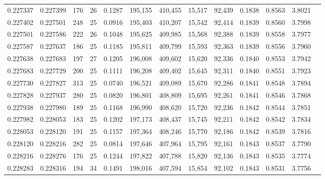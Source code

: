 \begin{tabular}{rrrrrrrrrrrrr}
0.227337 & 0.227399 &   176 &  26 &                                     0.1287 & 195,155 & 410,455 &  15,517 &  92,439 & 0.1838 & 0.8563 & 3.8021 \\
0.227402 & 0.227501 &   248 &  25 &                                     0.0916 & 195,403 & 410,207 &  15,542 &  92,414 & 0.1839 & 0.8560 & 3.7998 \\
0.227501 & 0.227586 &   222 &  26 &                                     0.1048 & 195,625 & 409,985 &  15,568 &  92,388 & 0.1839 & 0.8558 & 3.7977 \\
0.227587 & 0.227637 &   186 &  25 &                                     0.1185 & 195,811 & 409,799 &  15,593 &  92,363 & 0.1839 & 0.8556 & 3.7960 \\
0.227638 & 0.227683 &   197 &  27 &                                     0.1205 & 196,008 & 409,602 &  15,620 &  92,336 & 0.1840 & 0.8553 & 3.7942 \\
0.227683 & 0.227729 &   200 &  25 &                                     0.1111 & 196,208 & 409,402 &  15,645 &  92,311 & 0.1840 & 0.8551 & 3.7923 \\
0.227730 & 0.227827 &   313 &  25 &                                     0.0740 & 196,521 & 409,089 &  15,670 &  92,286 & 0.1841 & 0.8548 & 3.7894 \\
0.227828 & 0.227937 &   280 &  25 &                                     0.0820 & 196,801 & 408,809 &  15,695 &  92,261 & 0.1841 & 0.8546 & 3.7868 \\
0.227938 & 0.227980 &   189 &  25 &                                     0.1168 & 196,990 & 408,620 &  15,720 &  92,236 & 0.1842 & 0.8544 & 3.7851 \\
0.227982 & 0.228053 &   183 &  25 &                                     0.1202 & 197,173 & 408,437 &  15,745 &  92,211 & 0.1842 & 0.8542 & 3.7834 \\
0.228053 & 0.228120 &   191 &  25 &                                     0.1157 & 197,364 & 408,246 &  15,770 &  92,186 & 0.1842 & 0.8539 & 3.7816 \\
0.228120 & 0.228216 &   282 &  25 &                                     0.0814 & 197,646 & 407,964 &  15,795 &  92,161 & 0.1843 & 0.8537 & 3.7790 \\
0.228216 & 0.228276 &   176 &  25 &                                     0.1244 & 197,822 & 407,788 &  15,820 &  92,136 & 0.1843 & 0.8535 & 3.7774 \\
0.228283 & 0.228316 &   194 &  34 &                                     0.1491 & 198,016 & 407,594 &  15,854 &  92,102 & 0.1843 & 0.8531 & 3.7756 \\

\end{tabular}
